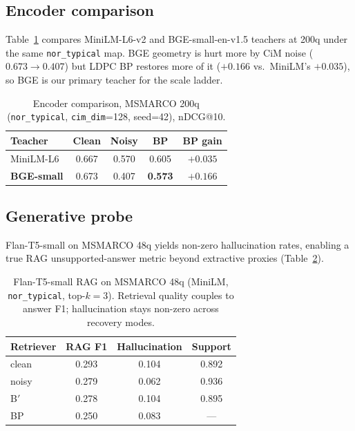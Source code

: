\documentclass[sigconf,review,anonymous]{acmart}
\begin{document}
\subsection{Encoder comparison}
Table~\ref{tab:encoder} compares MiniLM-L6-v2 and BGE-small-en-v1.5 teachers at 200q under the same \texttt{nor\_typical} map.
BGE geometry is hurt more by CiM noise ($0.673\rightarrow0.407$) but LDPC BP restores more of it ($+0.166$ vs.\ MiniLM's $+0.035$), so BGE is our primary teacher for the scale ladder.
\begin{table}[t]
\caption{Encoder comparison, MSMARCO 200q (\texttt{nor\_typical}, \texttt{cim\_dim}=128, seed=42), nDCG@10.}
\label{tab:encoder}
\begin{tabular}{lcccc}
\toprule
Teacher & Clean & Noisy & BP & BP gain \\
\midrule
MiniLM-L6 & 0.667 & 0.570 & 0.605 & $+0.035$ \\
\textbf{BGE-small} & 0.673 & 0.407 & \textbf{0.573} & $\mathbf{+0.166}$ \\
\bottomrule
\end{tabular}
\end{table}

\subsection{Generative probe}
Flan-T5-small on MSMARCO 48q yields non-zero hallucination rates, enabling a true RAG unsupported-answer metric beyond extractive proxies (Table~\ref{tab:rag}).
\begin{table}[t]
\caption{Flan-T5-small RAG on MSMARCO 48q (MiniLM, \texttt{nor\_typical}, top-$k{=}3$). Retrieval quality couples to answer F1; hallucination stays non-zero across recovery modes.}
\label{tab:rag}
\begin{tabular}{lccc}
\toprule
Retriever & RAG F1 & Hallucination & Support \\
\midrule
clean & 0.293 & 0.104 & 0.892 \\
noisy & 0.279 & 0.062 & 0.936 \\
B$'$ & 0.278 & 0.104 & 0.895 \\
BP & 0.250 & 0.083 & --- \\
\bottomrule
\end{tabular}
\end{table}
\end{document}
